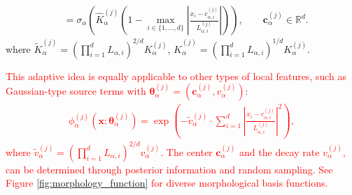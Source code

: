 \documentclass{article}
\newcommand{\red}[1]{\textcolor{red}{#1}}
\theoremstyle{plain}
\theoremstyle{definition}
\begin{document}
{{\begin{align}
    &=
    \sigma_\alpha\!\left(
    \hat{K}_\alpha^{(j)}
    \left(
    1-\max_{i\in\{1,\dots,d\}}
    \left|\frac{x_i-c_{\alpha,i}^{(j)}}{L_{\alpha,i}^{(j)}}\right|
    \right)
    \right),
    \qquad
    \boldsymbol{c}_\alpha^{(j)}\in\mathbb{R}^d.
\end{align}
where $\tilde{K}_{\alpha}^{(j)}=(\prod_{i=1}^dL_{\alpha,i})^{2/d}K_{\alpha}^{(j)}$, $\hat{K}_{\alpha}^{(j)}=(\prod_{i=1}^dL_{\alpha,i})^{1/d}K_{\alpha}^{(j)}$.}

\red{This adaptive idea is equally applicable to other types of local features,  such as Gaussian-type source terms with $\boldsymbol{\theta}_\alpha^{(j)}=(\boldsymbol{c}_\alpha^{(j)},v_\alpha^{(j)})$:
\begin{align}
    \label{Gauss}
    \phi_\alpha^{(j)}(\boldsymbol{x};\boldsymbol{\theta}_\alpha^{(j)})= \exp\left(-\tilde{v}_\alpha^{(j)} \cdot \sum_{i=1}^d\left|\frac{x_i - c_{\alpha,i}^{(j)}}{L_{\alpha,i}^{(j)}}\right|^2\right),
\end{align}
where $\tilde{v}^{(j)}_\alpha=(\prod_{i=1}^dL_{\alpha,i})^{2/d}v^{(j)}_\alpha$. The center $\boldsymbol{c}^{(j)}_\alpha$ and the decay rate $v^{(j)}_{\alpha}$, can be determined through posterior information and random sampling. See Figure \ref{fig:morphology_function} for diverse morphological basis functions.}

\begin{figure}[H]
    \centering
    \captionsetup[subfigure]{justification=centering, labelformat=parens}


\end{figure}}
\end{document}
